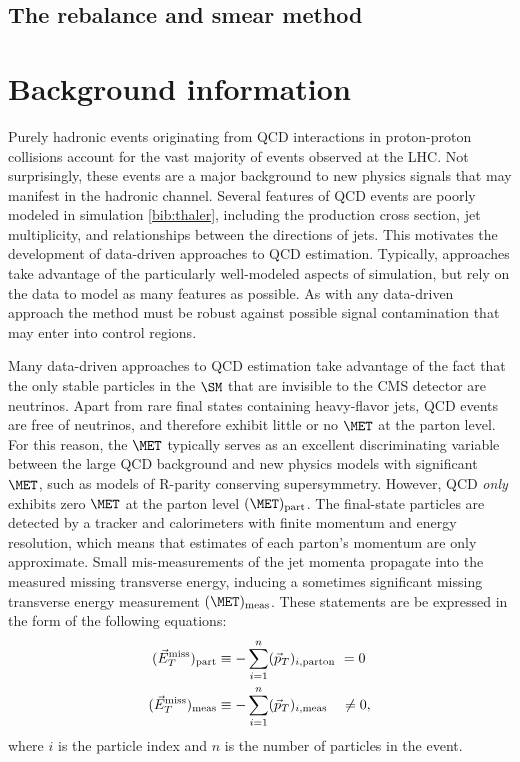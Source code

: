 \subsection{The rebalance and smear method}

\section{Background information}
Purely hadronic events originating from QCD interactions in proton-proton collisions account for the vast majority of events observed at the LHC. Not surprisingly, these events are a major background to new physics signals that may manifest in the hadronic channel. Several features of QCD events are poorly modeled in simulation \ref{bib:thaler}, including the production cross section, jet multiplicity, and relationships between the directions of jets. This motivates the development of data-driven approaches to QCD estimation. Typically, approaches take advantage of the particularly well-modeled aspects of simulation, but rely on the data to model as many features as possible. As with any data-driven approach the method must be robust against possible signal contamination that may enter into control regions. 

Many data-driven approaches to QCD estimation take advantage of the fact that the only stable particles in the $\SM$ that are invisible to the CMS detector are neutrinos. Apart from rare final states containing heavy-flavor jets,  QCD events are free of neutrinos, and therefore exhibit little or no $\MET$ at the parton level.  For this reason, the $\MET$ typically serves as an excellent discriminating variable between the large QCD background and new physics models with significant $\MET$, such as models of R-parity conserving supersymmetry. However, QCD {\it only} exhibits zero $\MET$ at the parton level $(\MET)_{\rm part}$. The final-state particles are detected by a tracker and calorimeters with finite momentum and energy resolution, which means that estimates of each parton's momentum are only approximate. Small mis-measurements of the jet momenta propagate into the measured missing transverse energy, inducing a sometimes significant missing transverse energy measurement $(\MET)_{\rm meas}$.  These statements are be expressed in the form of the following equations:
\begin{align}
(\vec{E}_{ T}^{\rm miss})_{\rm part} &\equiv -\sum_{i=1}^{n}(\vec{p}_{T})_{i,\rm parton\ }=0\\
(\vec{E}_{ T}^{\rm miss})_{\rm meas} &\equiv -\sum_{i=1}^{n}(\vec{p}_{T})_{i,\rm meas\ \ \ }\neq 0,
\label{eq:metTrue}
\end{align}
where $i$ is the particle index and $n$ is the number of particles in the event.

